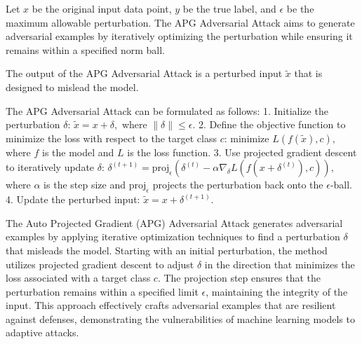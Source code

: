 Let \( x \) be the original input data point, \( y \) be the true label, and \( \epsilon \) be the maximum allowable perturbation. The APG Adversarial Attack aims to generate adversarial examples by iteratively optimizing the perturbation while ensuring it remains within a specified norm ball.

The output of the APG Adversarial Attack is a perturbed input \( \tilde{x} \) that is designed to mislead the model.

The APG Adversarial Attack can be formulated as follows:
1. Initialize the perturbation \( \delta \):
   $
   \tilde{x} = x + \delta,
   $
   where \( \|\delta\| \leq \epsilon \).
2. Define the objective function to minimize the loss with respect to the target class \( c \):
   $
   \text{minimize } L(f(\tilde{x}), c),
   $
   where \( f \) is the model and \( L \) is the loss function.
3. Use projected gradient descent to iteratively update \( \delta \):
   $
   \delta^{(t+1)} = \text{proj}_{\epsilon} \left( \delta^{(t)} - \alpha \nabla_{\delta} L(f(x + \delta^{(t)}), c) \right),
   $
   where \( \alpha \) is the step size and \( \text{proj}_{\epsilon} \) projects the perturbation back onto the \( \epsilon \)-ball.
4. Update the perturbed input:
   $
   \tilde{x} = x + \delta^{(t+1)}.
   $

The Auto Projected Gradient (APG) Adversarial Attack generates adversarial examples by applying iterative optimization techniques to find a perturbation \( \delta \) that misleads the model. Starting with an initial perturbation, the method utilizes projected gradient descent to adjust \( \delta \) in the direction that minimizes the loss associated with a target class \( c \). The projection step ensures that the perturbation remains within a specified limit \( \epsilon \), maintaining the integrity of the input. This approach effectively crafts adversarial examples that are resilient against defenses, demonstrating the vulnerabilities of machine learning models to adaptive attacks.

